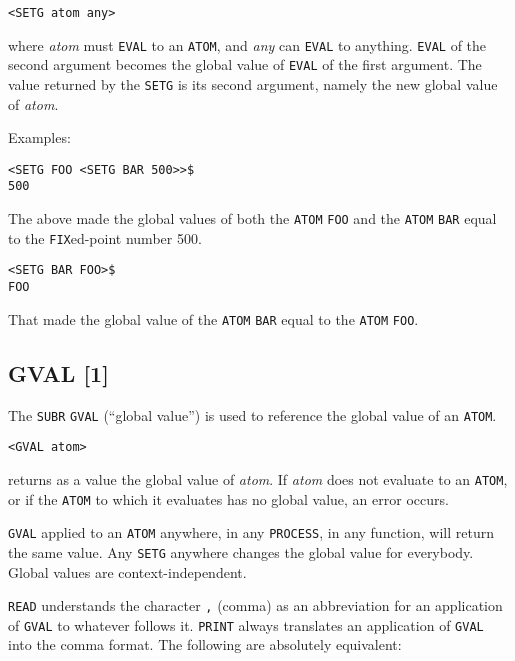 \documentclass[a4paper]{scrbook}
\begin{document}
\begin{verbatim}
<SETG atom any>
\end{verbatim}

where \emph{atom} must \texttt{EVAL} to an \texttt{ATOM}, and \emph{any} can \texttt{EVAL} to anything. \texttt{EVAL} of
the second argument becomes the global value of \texttt{EVAL} of the first argument. The value returned by the
\texttt{SETG} is its second argument, namely the new global value of \emph{atom}.

Examples:

\begin{verbatim}
<SETG FOO <SETG BAR 500>>$
500
\end{verbatim}

The above made the global values of both the \texttt{ATOM} \texttt{FOO} and the \texttt{ATOM} \texttt{BAR} equal to the
\texttt{FIX}ed-point number 500.

\begin{verbatim}
<SETG BAR FOO>$
FOO
\end{verbatim}

That made the global value of the \texttt{ATOM} \texttt{BAR} equal to the \texttt{ATOM} \texttt{FOO}.

\subsection{GVAL {[}1{]}}\label{gval-1}

The \texttt{SUBR} \texttt{GVAL} (``global value'') is used to reference the global value of an
\texttt{ATOM}.

\begin{verbatim}
<GVAL atom>
\end{verbatim}

returns as a value the global value of \emph{atom}. If \emph{atom} does not evaluate to an \texttt{ATOM}, or if the
\texttt{ATOM} to which it evaluates has no global value, an error occurs.

\texttt{GVAL} applied to an \texttt{ATOM} anywhere, in any \texttt{PROCESS}, in any function, will return the same value.
Any \texttt{SETG} anywhere changes the global value for everybody. Global values are context-independent.

\texttt{READ} understands the character \texttt{,}  (comma) as an abbreviation for an application
of \texttt{GVAL} to whatever follows it. \texttt{PRINT} always translates an application of \texttt{GVAL} into the comma
format. The following are absolutely equivalent:
\end{document}
